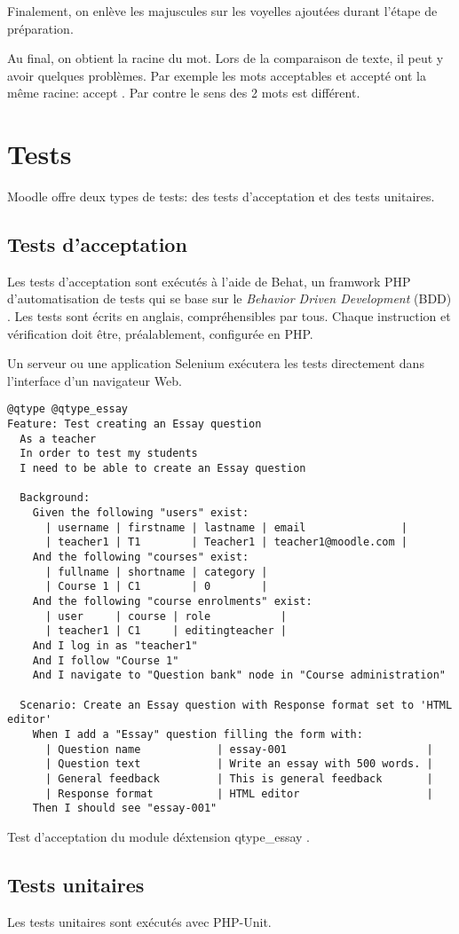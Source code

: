 Finalement, on enlève les majuscules sur les voyelles ajoutées durant l'étape de préparation.

Au final, on obtient la racine du mot.
Lors de la comparaison de texte, il peut y avoir quelques problèmes.
Par exemple les mots \og acceptables \fg{} et \og accepté \fg{} ont la même racine: \og accept \fg{}.
Par contre le sens des 2 mots est différent.

\section{Tests}

Moodle offre deux types de tests: des tests d'acceptation et des tests unitaires.

\subsection{Tests d'acceptation}

Les tests d'acceptation sont exécutés à l'aide de Behat, un \og framwork \fg{} PHP d'automatisation de tests qui se base sur le \og \textit{Behavior Driven Development} (BDD) \fg{}.
Les tests sont écrits en anglais, compréhensibles par tous.
Chaque instruction et vérification doit être, préalablement, configurée en PHP.

Un serveur ou une application Selenium exécutera les tests directement dans l'interface d'un navigateur Web.

\begin{lstfloat}
\begin{lstlisting}[frame=l]
@qtype @qtype_essay
Feature: Test creating an Essay question
  As a teacher
  In order to test my students
  I need to be able to create an Essay question

  Background:
    Given the following "users" exist:
      | username | firstname | lastname | email               |
      | teacher1 | T1        | Teacher1 | teacher1@moodle.com |
    And the following "courses" exist:
      | fullname | shortname | category |
      | Course 1 | C1        | 0        |
    And the following "course enrolments" exist:
      | user     | course | role           |
      | teacher1 | C1     | editingteacher |
    And I log in as "teacher1"
    And I follow "Course 1"
    And I navigate to "Question bank" node in "Course administration"

  Scenario: Create an Essay question with Response format set to 'HTML editor'
    When I add a "Essay" question filling the form with:
      | Question name            | essay-001                      |
      | Question text            | Write an essay with 500 words. |
      | General feedback         | This is general feedback       |
      | Response format          | HTML editor                    |
    Then I should see "essay-001"
\end{lstlisting}
\caption{Test d'acceptation du module d\'extension \og qtype\_essay \fg{}.}
\label{code:commentaire}
\end{lstfloat}

\subsection{Tests unitaires}

Les tests unitaires sont exécutés avec PHP-Unit.

